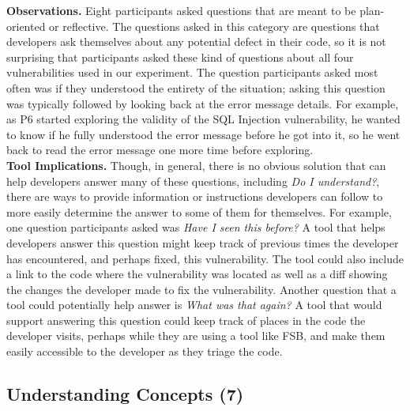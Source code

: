 \documentclass[conference]{IEEEtran}
\begin{document}
\noindent\textbf{Observations.}
Eight participants asked questions that are meant to be plan-oriented or reflective.
The questions asked in this category are questions that developers ask themselves about any potential defect in their code, so it is not surprising that participants asked these kind of questions about all four vulnerabilities used in our experiment.
The question participants asked most often was if they understood the entirety of the situation; asking this question was typically followed by looking back at the error message details. 
For example, as P6 started exploring the validity of the SQL Injection vulnerability, he wanted to know if he fully understood the error message before he got into it, so he went back to read the error message one more time before exploring.
\\

\noindent\textbf{Tool Implications.}
Though, in general, there is no obvious solution that can help developers answer many of these questions, including \textit{Do I understand?}, there are ways to provide information or instructions developers can follow to more easily determine the answer to some of them for themselves. 
For example, one question participants asked was \textit{Have I seen this before?}
A tool that helps developers answer this question might keep track of previous times the developer has encountered, and perhaps fixed, this vulnerability. 
The tool could also include a link to the code where the vulnerability was located as well as a diff showing the changes the developer made to fix the vulnerability.
Another question that a tool could potentially help answer is \textit{What was that again?} 
A tool that would support answering this question could keep track of places in the code the developer visits, perhaps while they are using a tool like FSB, and make them easily accessible to the developer as they triage the code.




\noindent\subsection{\textbf{Understanding Concepts (7)}}\label{uc}
\end{document}
